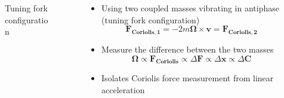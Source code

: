 \documentclass[10pt]{beamer}
\begin{document}
\begin{frame}
\begin{columns}
\begin{column}{.48\textwidth}
\begin{figure}
        \caption{Tuning fork configuration}
        \end{figure}
    \end{column}
    \hfill
    \begin{column}{.60\textwidth}
        \begin{itemize}
            \item Using two coupled masses vibrating in antiphase (tuning fork configuration)
            \begin{equation*}
                \mathbf{F_{Coriolis, 1}} = - 2 m \mathbf{\Omega} \times \mathbf{v} = \mathbf{F_{Coriolis, 2}}
            \end{equation*}
            \item Measure the difference between the two masses
            \begin{equation*}
                \mathbf{\Omega} \propto \mathbf{F_{Coriolis}} \propto \Delta \mathbf{F} \propto \Delta \mathbf{x} \propto \Delta \mathbf{C}
            \end{equation*}
            \item Isolates Coriolis force measurement from linear acceleration
        \end{itemize}
    \end{column}
\end{columns}
\end{frame}
\end{document}
